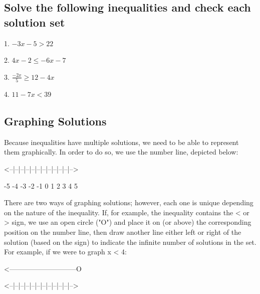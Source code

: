 \subsection{Solve the following inequalities and check each solution set}
\label{sss:solv-7eee}




1. $-3x - 5 > 22$



2. $4x - 2 \leq -6x - 7$



3. $\frac{-2x}{5} \geq 12 - 4x$



4. $11 - 7x < 39$




\subsection{Graphing Solutions}
\label{sss:grap-296e}




Because inequalities have multiple solutions, we need to be able to represent them
graphically. In order to do so, we use the number line, depicted below:



                        <--|--|--|--|--|--|--|--|--|--|--|-->

                          -5 -4 -3 -2 -1  0  1  2  3  4  5





There are two ways of graphing solutions; however, each one is unique depending on the
nature of the inequality. If, for example, the inequality contains the < or > sign, we use
an open circle ("O") and place it on (or above) the corresponding position on the number
line, then draw another line either left or right of the solution (based on the sign) to
indicate the infinite number of solutions in the set. For example, if we were to graph x <
4:



                        <-----------------------------O

                        <--|--|--|--|--|--|--|--|--|--|--|-->

